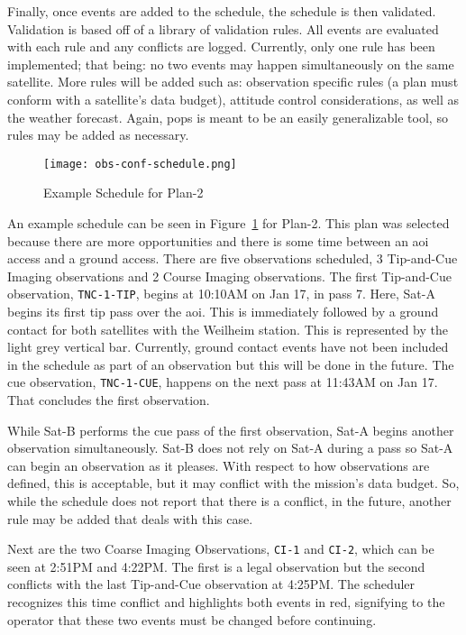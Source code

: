 Finally, once events are added to the schedule, the schedule is then validated.
Validation is based off of a library of validation rules. All events are
evaluated with each rule and any conflicts are logged. Currently, only one rule
has been implemented; that being: no two events may happen simultaneously on
the same satellite. More rules will be added such as: observation specific
rules (a plan must conform with a satellite’s data budget), attitude control
considerations, as well as the weather forecast. Again, \gls{pops} is meant to
be an easily generalizable tool, so rules may be added as necessary.


\begin{figure}[h]
    \centering
    \texttt{[image: obs-conf-schedule.png]} 
    \caption{Example Schedule for Plan-2}
    \label{fig:obs-conf-schedule}
\end{figure}

An example schedule can be seen in Figure~\ref{fig:obs-conf-schedule} for
Plan-2. This plan was selected because there are more opportunities and there is
some time between an \gls{aoi} access and a ground access. There are five
observations scheduled, 3 Tip-and-Cue Imaging observations and 2 Course Imaging
observations. The first Tip-and-Cue observation, \texttt{TNC-1-TIP}, begins at
10:10AM on Jan 17, in pass 7. Here, Sat-A begins its first tip pass over the
\gls{aoi}.  This is immediately followed by a ground contact for both
satellites with the Weilheim station. This is represented by the light grey
vertical bar.  Currently, ground contact events have not been included in the
schedule as part of an observation but this will be done in the future.  The
cue observation, \texttt{TNC-1-CUE}, happens on the next pass at 11:43AM on Jan
17.  That concludes the first observation.

While Sat-B performs the cue pass of the first observation, Sat-A begins
another observation simultaneously. Sat-B does not rely on Sat-A during a pass
so Sat-A can begin an observation as it pleases. With respect to how
observations are defined, this is acceptable, but it may conflict with the
mission's data budget. So, while the schedule does not report that there is a
conflict, in the future, another rule may be added that deals with this case.

Next are the two Coarse Imaging Observations, \texttt{CI-1} and \texttt{CI-2},
which can be seen at 2:51PM and 4:22PM\@. The first is a legal observation but
the second conflicts with the last Tip-and-Cue observation at 4:25PM\@. The
scheduler recognizes this time conflict and highlights both events in red,
signifying to the operator that these two events must be changed before
continuing.

